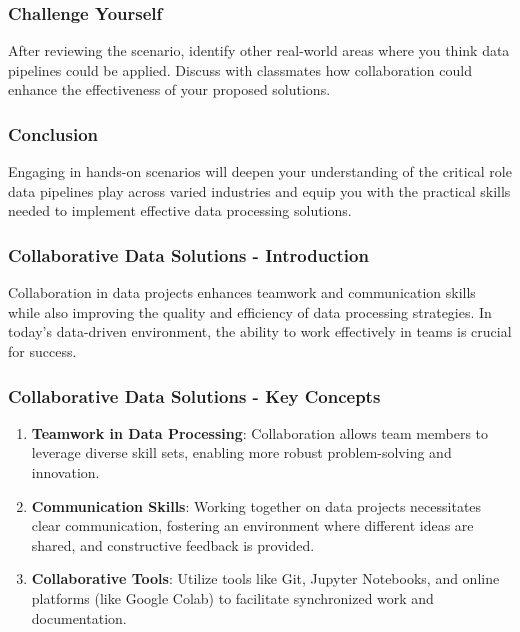 \documentclass{beamer}
\begin{document}
\begin{frame}
    \frametitle{Challenge Yourself}
    After reviewing the scenario, identify other real-world areas where you think data pipelines could be applied. 
    Discuss with classmates how collaboration could enhance the effectiveness of your proposed solutions.
\end{frame}

\begin{frame}
    \frametitle{Conclusion}
    Engaging in hands-on scenarios will deepen your understanding of the critical role data pipelines play across varied industries and equip you with the practical skills needed to implement effective data processing solutions.
\end{frame}

\begin{frame}[fragile]
    \frametitle{Collaborative Data Solutions - Introduction}
    Collaboration in data projects enhances teamwork and communication skills while also improving the quality and efficiency of data processing strategies. 
    In today's data-driven environment, the ability to work effectively in teams is crucial for success.
\end{frame}

\begin{frame}[fragile]
    \frametitle{Collaborative Data Solutions - Key Concepts}
    \begin{enumerate}
        \item \textbf{Teamwork in Data Processing}: 
        Collaboration allows team members to leverage diverse skill sets, enabling more robust problem-solving and innovation.
        
        \item \textbf{Communication Skills}: 
        Working together on data projects necessitates clear communication, fostering an environment where different ideas are shared, and constructive feedback is provided.
        
        \item \textbf{Collaborative Tools}: 
        Utilize tools like Git, Jupyter Notebooks, and online platforms (like Google Colab) to facilitate synchronized work and documentation.
    \end{enumerate}
\end{frame}
\end{document}
